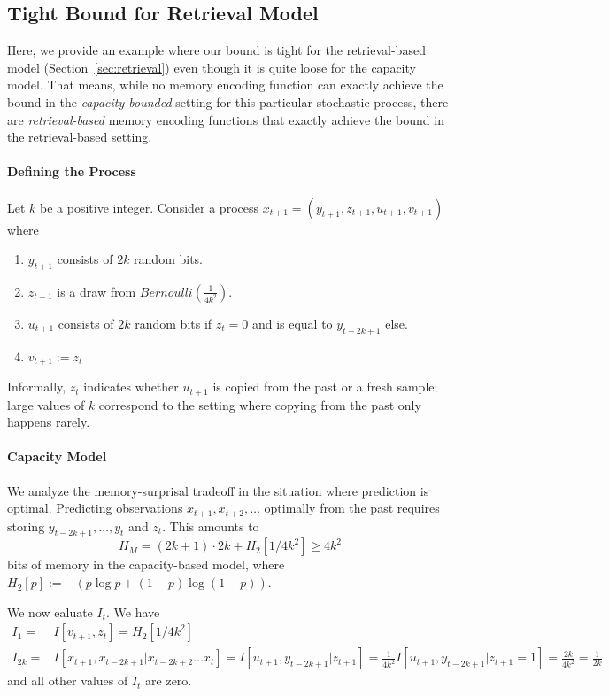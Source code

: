 \documentclass[11pt,letterpaper]{article}
\begin{document}
\subsection{Tight Bound for Retrieval Model}

Here, we provide an example where our bound is tight for the retrieval-based model (Section~\ref{sec:retrieval}) even though it is quite loose for the capacity model.
That means, while no memory encoding function can exactly achieve the bound in the \emph{capacity-bounded} setting for this particular stochastic process, there are \emph{retrieval-based} memory encoding functions that exactly achieve the bound in the retrieval-based setting.

\paragraph{Defining the Process}
Let $k$ be a positive integer.
Consider a process $x_{t+1} = (y_{t+1}, z_{t+1}, u_{t+1}, v_{t+1})$ where
\begin{enumerate}
    \item $y_{t+1}$ consists of $2k$ random bits.
    \item $z_{t+1}$ is a draw from $Bernoulli(\frac{1}{4k^2})$.
    \item $u_{t+1}$ consists of $2k$ random bits if $z_t = 0$ and is equal to $y_{t-2k+1}$ else.
    \item $v_{t+1} := z_t$ 
\end{enumerate}
Informally, $z_t$ indicates whether $u_{t+1}$ is copied from the past or a fresh sample; large values of $k$ correspond to the setting where copying from the past only happens rarely.

\paragraph{Capacity Model}
We analyze the memory-surprisal tradeoff in the situation where prediction is optimal.
Predicting observations $x_{t+1}, x_{t+2}, \dots$ optimally from the past requires storing $y_{t-2k+1}, \dots, y_{t}$ and $z_t$.
This amounts to
\begin{equation}
    H_M = (2k+1)\cdot 2k + H_2[1/4k^2] \geq 4k^2
\end{equation} 
bits of memory in the capacity-based model, where $H_2[p] := -(p\log p + (1-p) \log (1-p))$.

We now ealuate $I_t$. We have
\begin{align}
I_1 =& I[v_{t+1}, z_t] = H_2[1/4k^2] \\
   I_{2k} =& I[x_{t+1}, x_{t-2k+1}|x_{t-2k+2}\dots x_t] = I[u_{t+1}, y_{t-2k+1}|z_{t+1}] = \frac{1}{4k^2} I[u_{t+1}, y_{t-2k+1}|z_{t+1}=1] = \frac{2k}{4k^2} = \frac{1}{2k} 
\end{align}
and all other values of $I_t$ are zero.
\end{document}
